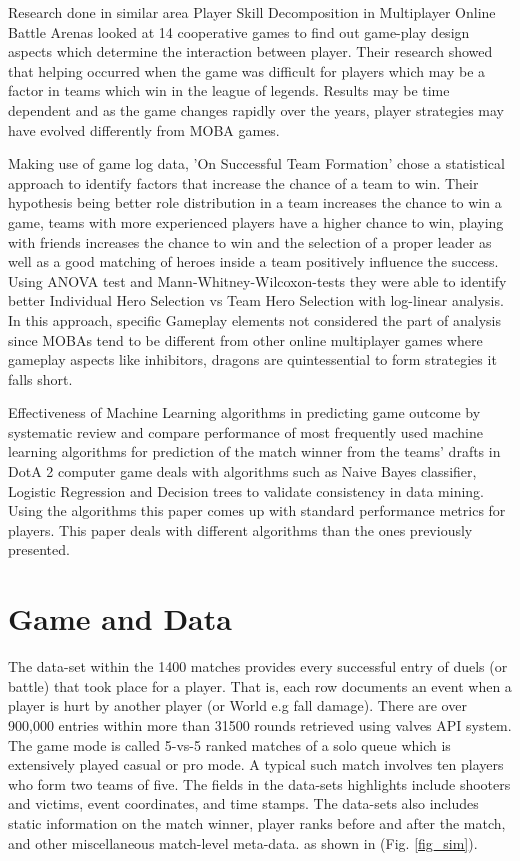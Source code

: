 \documentclass[conference]{IEEEtran}
\begin{document}
Research done in similar area  Player Skill Decomposition in Multiplayer Online Battle Arenas \cite{Chen2016} looked at 14 cooperative games to find out game-play design aspects which determine the interaction between player. Their research showed that helping occurred when the game was difficult for players which may be a factor in teams which win in the league of legends. Results may be time dependent and as the game changes rapidly over the years, player strategies may have evolved differently from MOBA games. 

Making use of game log data, 'On Successful Team Formation' \cite{Pobiedina2013b} chose a statistical approach to identify factors that increase the chance of a team to win. Their hypothesis being better role distribution in a team increases the chance to win a game,     teams with more experienced players have a higher chance to win, playing with friends increases the chance to win and
the selection of a proper leader as well as a good matching of heroes inside a team positively influence the success. Using ANOVA test and Mann-Whitney-Wilcoxon-tests they were able to identify better Individual Hero Selection vs Team Hero Selection with log-linear analysis. In this approach, specific Gameplay elements not considered the part of analysis since MOBAs tend to be different from other online multiplayer games where gameplay aspects like inhibitors, dragons are quintessential to form strategies it falls short.
  
Effectiveness of Machine Learning algorithms in predicting game outcome by systematic review and compare performance of most frequently used machine learning algorithms for prediction of the match winner from the teams' drafts in DotA 2 computer game \cite{Semenov} deals with algorithms such as Naive Bayes classifier, Logistic Regression and Decision trees to validate consistency in data mining. Using the algorithms this paper comes up with standard performance metrics for players. This paper deals with different algorithms than the ones previously presented.

\section{Game and Data}
The data-set within the 1400 matches provides every successful entry of duels (or battle) that took place for a player. That is, each row documents an event when a player is hurt by another player (or World e.g fall damage). There are over 900,000 entries within more than 31500 rounds retrieved using valves API system. The game mode is called 5-vs-5 ranked matches of a solo queue which is extensively played casual or pro mode. A typical such match involves ten players who form two teams of five. The fields in the data-sets highlights include shooters and victims, event coordinates, and time stamps. The data-sets also includes static information on the match winner, player ranks before and after the match, and other miscellaneous match-level meta-data. as shown in (Fig. \ref{fig_sim}).
\end{document}
